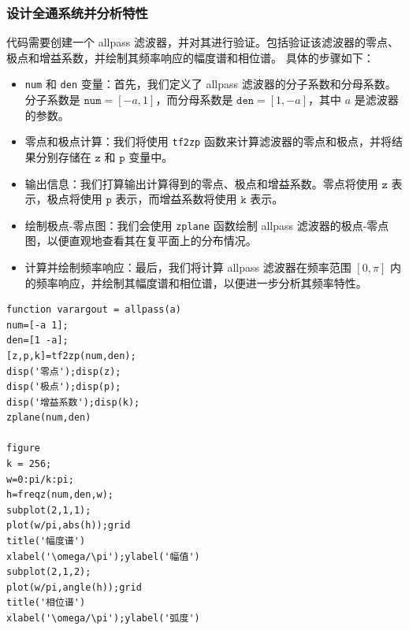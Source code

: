 \documentclass[a4paper,12pt]{article}
\begin{document}
\subsubsection{设计全通系统并分析特性}
代码需要创建一个 allpass 滤波器，并对其进行验证。包括验证该滤波器的零点、极点和增益系数，并绘制其频率响应的幅度谱和相位谱。
具体的步骤如下：

\begin{itemize}
    \item \texttt{num} 和 \texttt{den} 变量：首先，我们定义了 allpass 滤波器的分子系数和分母系数。分子系数是 \(\texttt{num} = [-a, 1]\)，而分母系数是 \(\texttt{den} = [1, -a]\)，其中 \(a\) 是滤波器的参数。
    
    \item 零点和极点计算：我们将使用 \texttt{tf2zp} 函数来计算滤波器的零点和极点，并将结果分别存储在 \(\texttt{z}\) 和 \(\texttt{p}\) 变量中。
    
    \item 输出信息：我们打算输出计算得到的零点、极点和增益系数。零点将使用 \(\texttt{z}\) 表示，极点将使用 \(\texttt{p}\) 表示，而增益系数将使用 \(\texttt{k}\) 表示。
    
    \item 绘制极点-零点图：我们会使用 \texttt{zplane} 函数绘制 allpass 滤波器的极点-零点图，以便直观地查看其在复平面上的分布情况。
    
    \item 计算并绘制频率响应：最后，我们将计算 allpass 滤波器在频率范围 \([0, \pi]\) 内的频率响应，并绘制其幅度谱和相位谱，以便进一步分析其频率特性。
\end{itemize}

\begin{lstlisting}
function varargout = allpass(a)
num=[-a 1]; 
den=[1 -a];
[z,p,k]=tf2zp(num,den); 
disp('零点');disp(z); 
disp('极点');disp(p); 
disp('增益系数');disp(k); 
zplane(num,den)

figure
k = 256;
w=0:pi/k:pi;
h=freqz(num,den,w);  
subplot(2,1,1); 
plot(w/pi,abs(h));grid 
title('幅度谱') 
xlabel('\omega/\pi');ylabel('幅值') 
subplot(2,1,2); 
plot(w/pi,angle(h));grid 
title('相位谱') 
xlabel('\omega/\pi');ylabel('弧度')
\end{lstlisting}
\end{document}
